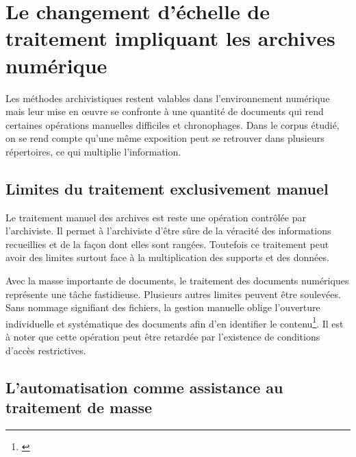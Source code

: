 \section{Le changement d’échelle de traitement impliquant les archives numérique}

Les méthodes archivistiques restent valables dans l’environnement numérique mais leur mise en œuvre se confronte à une quantité de documents qui rend certaines opérations manuelles difficiles et chronophages. Dans le corpus étudié, on se rend compte qu'une même exposition peut se retrouver dans plusieurs répertoires, ce qui multiplie l'information.

\subsection*{Limites du traitement exclusivement manuel}

Le traitement manuel des archives est reste une opération contrôlée par l'archiviste. Il permet à l'archiviste d'être sûre de la véracité des informations recueillies et de la façon dont elles sont rangées. Toutefois ce traitement peut avoir des limites surtout face à la multiplication des supports et des données. 

Avec la masse importante de documents, le traitement des documents numériques représente une tâche fastidieuse. Plusieurs autres limites peuvent être soulevées. Sans nommage signifiant des fichiers, la gestion manuelle oblige l'ouverture individuelle et systématique des documents afin d'en identifier le contenu\footnote{\cite{chabin-vrac-2016}}. Il est à noter que cette opération peut être retardée par l'existence de conditions d'accès restrictives.


\subsection*{L’automatisation comme assistance au traitement de masse}

